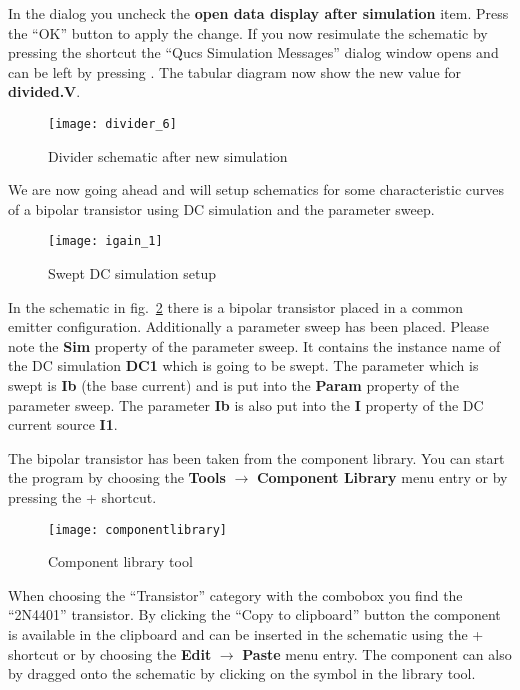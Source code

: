 In the dialog you uncheck the \textbf{open data display after
simulation} item.  Press the ``OK'' button to apply the change.  If
you now resimulate the schematic by pressing the 
shortcut the ``Qucs Simulation Messages'' dialog window opens and can
be left by pressing \Esc.  The tabular diagram now show the new value
for \textbf{divided.V}.

\begin{figure}[ht]
  \centering
  \texttt{[image: divider\_6]}
  \caption{Divider schematic after new simulation}
  \label{fig:divider_6}
\end{figure}
\FloatBarrier


We are now going ahead and will setup schematics for some
characteristic curves of a bipolar transistor using DC simulation and
the parameter sweep.

\begin{figure}[ht]
  \centering
  \texttt{[image: igain\_1]}
  \caption{Swept DC simulation setup}
  \label{fig:igain_1}
\end{figure}
\FloatBarrier

In the schematic in fig.~\ref{fig:igain_1} there is a bipolar
transistor placed in a common emitter configuration.  Additionally a
parameter sweep has been placed.  Please note the \textbf{Sim}
property of the parameter sweep.  It contains the instance name of the
DC simulation \textbf{DC1} which is going to be swept.  The parameter
which is swept is \textbf{Ib} (the base current) and is put into the
\textbf{Param} property of the parameter sweep.  The parameter
\textbf{Ib} is also put into the \textbf{I} property of the DC current
source \textbf{I1}.


The bipolar transistor has been taken from the component library.  You
can start the program by choosing the \textbf{Tools} $\rightarrow$
\textbf{Component Library} menu entry or by pressing the
\Ctrl+ shortcut.

\begin{figure}[ht]
  \centering
  \texttt{[image: componentlibrary]}
  \caption{Component library tool}
  \label{fig:componentlibrary}
\end{figure}
\FloatBarrier

When choosing the ``Transistor'' category with the combobox you find
the ``2N4401'' transistor.  By clicking the ``Copy to clipboard''
button the component is available in the clipboard and can be inserted
in the schematic using the \Ctrl+ shortcut or by choosing
the \textbf{Edit} $\rightarrow$ \textbf{Paste} menu entry.  The
component can also by dragged onto the schematic by clicking on the
symbol in the library tool.

